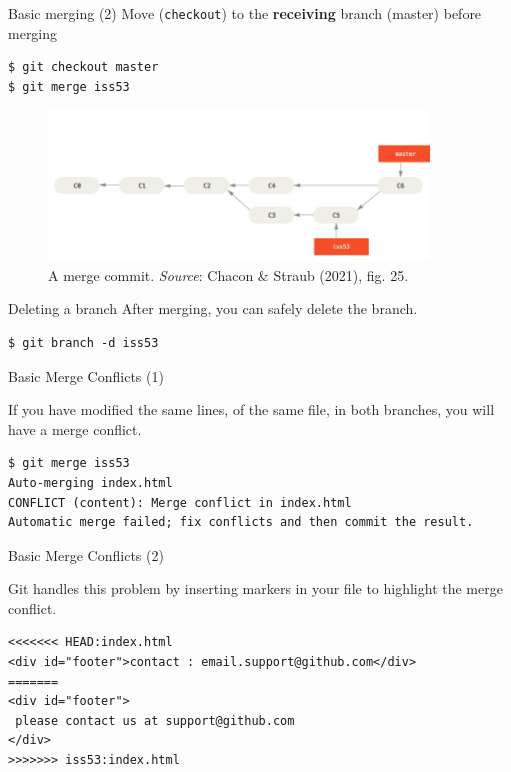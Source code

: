 \documentclass[handout]{beamer}
\begin{document}
\begin{frame}[fragile]{Basic merging (2)}
Move (\texttt{checkout}) to the \textbf{receiving} branch ({master}) before merging
\begin{lstlisting}
$ git checkout master
$ git merge iss53
\end{lstlisting}
\begin{figure}
	\includegraphics[width=0.9\textwidth]{figures/fig25_merge.png}
	\caption{A merge commit. \textit{Source}: Chacon \& Straub (2021), fig. 25.}
\end{figure}
\end{frame}

\begin{frame}[fragile]{Deleting a branch}
After merging, you can safely delete the branch. 
\begin{lstlisting}
$ git branch -d iss53
\end{lstlisting}
\end{frame}

\begin{frame}[fragile]{Basic Merge Conflicts (1)}

If you have modified the same lines, of the same file, in both branches, you will have a merge conflict. 

\begin{lstlisting}
$ git merge iss53
Auto-merging index.html
CONFLICT (content): Merge conflict in index.html
Automatic merge failed; fix conflicts and then commit the result.
\end{lstlisting}

\end{frame}

\begin{frame}[fragile]{Basic Merge Conflicts (2)}

Git handles this problem by inserting markers in your file to highlight the merge conflict.

\begin{lstlisting}
<<<<<<< HEAD:index.html
<div id="footer">contact : email.support@github.com</div>
=======
<div id="footer">
 please contact us at support@github.com
</div>
>>>>>>> iss53:index.html
\end{lstlisting}

\end{frame}
\end{document}
